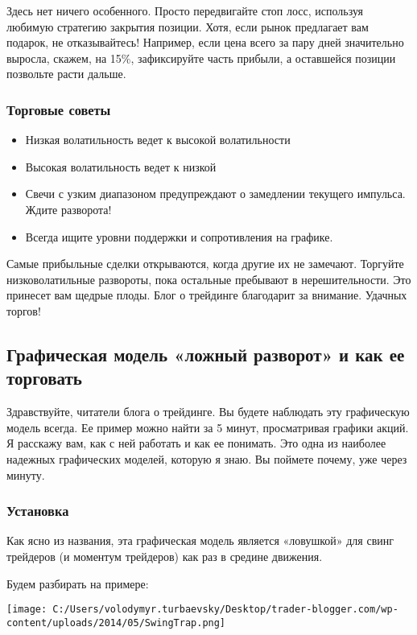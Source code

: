 \documentclass[a5paper]{article}
\begin{document}
Здесь нет ничего особенного. Просто передвигайте стоп лосс, используя любимую стратегию закрытия позиции. Хотя, если рынок предлагает вам подарок, не отказывайтесь! Например, если цена всего за пару дней значительно выросла, скажем, на 15\%, зафиксируйте часть прибыли, а оставшейся позиции позвольте расти дальше.

\subsubsection{Торговые советы}
\begin{itemize}
\item     Низкая волатильность ведет к высокой волатильности
\item     Высокая волатильность ведет к низкой
\item     Свечи с узким диапазоном предупреждают о замедлении текущего импульса. Ждите разворота!
\item     Всегда ищите уровни поддержки и сопротивления на графике.
\end{itemize}

Самые прибыльные сделки открываются, когда другие их не замечают. Торгуйте низковолатильные развороты, пока остальные пребывают в нерешительности. Это принесет вам щедрые плоды. Блог о трейдинге благодарит за внимание. Удачных торгов!

\subsection{Графическая модель «ложный разворот» и как ее торговать}

Здравствуйте, читатели блога о трейдинге. Вы будете наблюдать эту
графическую модель всегда. Ее пример можно найти за 5 минут,
просматривая графики акций. Я расскажу вам, как с ней работать и как
ее понимать. Это одна из наиболее надежных графических моделей,
которую я знаю. Вы поймете почему, уже через минуту.

\subsubsection{Установка}

Как ясно из названия, эта графическая модель является «ловушкой» для свинг трейдеров (и моментум трейдеров) как раз в средине движения.

Будем разбирать на примере:

\texttt{[image: C:/Users/volodymyr.turbaevsky/Desktop/trader-blogger.com/wp-content/uploads/2014/05/SwingTrap.png]}
\end{document}
